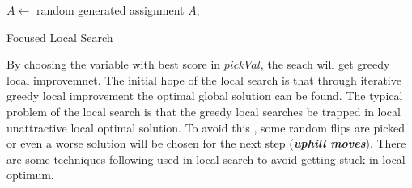 \documentclass[12pt,a4paper,twoside]{scrartcl}
\numberwithin{equation}{section}
\begin{document}
\begin{algorithm}[H]
  $A \leftarrow$ random generated assignment  $A$;\;
 \caption{Focused Local Search}
\end{algorithm}  

By choosing the variable with best score in $pickVal$, the seach will get greedy local improvemnet. 
The initial hope of the local search is that through iterative greedy local improvement the optimal global solution can be found. The typical problem of the local search is that the greedy local searches be trapped in local unattractive local optimal solution.  To avoid this , some random flips are picked or even a worse solution  will be chosen for the next step (\emph{\textbf{uphill moves}}). There are some techniques following used in local search to avoid getting stuck in local optimum.
\end{document}

